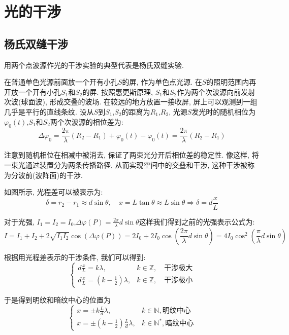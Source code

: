 \graphicspath{{figure/chap2/}}
\chapter{光的干涉}
\section{杨氏双缝干涉}
用两个点波源作光的干涉实验的典型代表是杨氏双缝实验.


在普通单色光源前面放一个开有小孔$S$的屏, 作为单色点光源. 在$S$的照明范围内再开放一个开有小孔$S_1$和$S_2$的屏. 按照惠更斯原理, $S_1$和$S_2$作为两个次波源向前发射次波(球面波), 形成交叠的波场. 在较远的地方放置一接收屏, 屏上可以观测到一组几乎是平行的直线条纹. 设从$S$到$S_1$,$S_2$的距离为$R_1$,$R_2$, 光源$S$发光时的随机相位为$\varphi_0(t)$,$S_1$和$S_2$两个次波源的相位差为:
\[
\Delta \varphi_0 = \frac{2\pi}{\lambda}(R_2-R_1) +\varphi_0(t)-\varphi_0(t) = \frac{2\pi}{\lambda}(R_2-R_1)
\]

注意到随机相位在相减中被消去, 保证了两束光分开后相位差的稳定性. 像这样, 将一束光通过装置分为两条传播路径, 从而实现空间中的交叠和干涉, 这种干涉被称为分波前(波阵面)的干涉.


如图所示, 光程差可以被表示为:
\[
\delta = r_2 - r_1 \approx d \sin \theta, \quad x =L\tan\theta \approx L \sin \theta \Rightarrow \delta = d \frac{x}{L}
\]

对于光强, $I_1 = I_2 = I_0 $,$\Delta \varphi(P) = \frac{2\pi}{\lambda} d\sin\theta$这样我们得到之前的光强表示公式为:
\[
I = I_1 + I_2 + 2\sqrt{I_1 I_2} \cos(\Delta \varphi(P)) = 2I_0+2I_0 \cos\left(\frac{2\pi}{\lambda} d \sin \theta \right) = 4I_0\cos^2\left(\frac{\pi}{\lambda} d \sin \theta \right)
\]

根据用光程差表示的干涉条件, 我们可以得到:
\[
\begin{cases}
d \frac{x}{L} = k \lambda, & k \in \mathbb{Z}, \quad \text{干涉极大} \\
d \frac{x}{L} = (k - \frac{1}{2}) \lambda, & k \in \mathbb{Z}, \quad \text{干涉极小}
\end{cases}
\]

于是得到明纹和暗纹中心的位置为
\[
\begin{cases}
x = \pm k\frac{L}{d}\lambda ,& k \in \mathbb{N}, \text{明纹中心}\\
x = \pm(k - \frac{1}{2})\frac{L}{d}\lambda, & k \in \mathbb{N}^{*},\text{暗纹中心}
\end{cases}
\]

